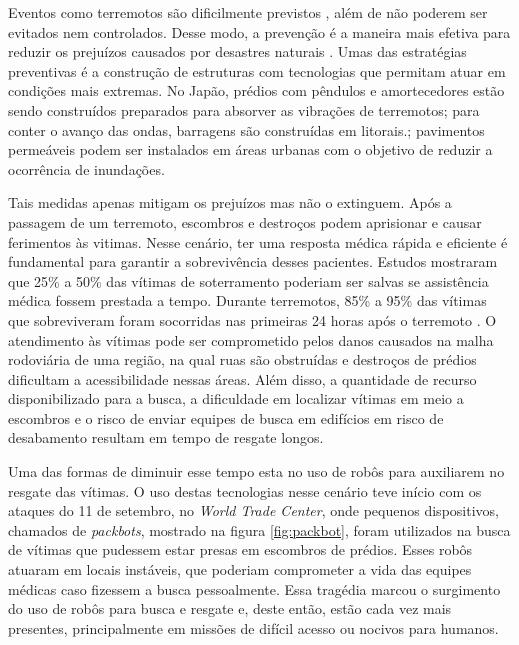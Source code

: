 Eventos como terremotos são dificilmente previstos \cite{kagan1997earthquakes}, além de não poderem ser evitados nem controlados\cite{office1995reducing}.
Desse modo, a prevenção é a maneira mais efetiva para reduzir os prejuízos causados por desastres naturais \cite{durkin1992improving}. Umas das estratégias preventivas é a construção de estruturas com tecnologias que permitam atuar em condições mais extremas. No Japão, prédios com pêndulos\cite{nagase2000earthquake} e amortecedores \cite{takewaki2011smart} estão sendo construídos preparados para absorver as vibrações de terremotos; para conter o avanço das ondas, barragens são construídas em litorais.\cite{kamphuis2010introduction}; pavimentos permeáveis podem ser instalados em áreas urbanas com o objetivo de reduzir a ocorrência de inundações.\cite{selbig2018evaluating}

Tais medidas apenas mitigam os prejuízos mas não o extinguem.
Após a passagem de um terremoto, escombros e destroços podem aprisionar e causar ferimentos às vitimas. Nesse cenário, ter uma resposta médica rápida e eficiente é fundamental para garantir a sobrevivência desses pacientes. Estudos mostraram que 25\% a 50\% das vítimas de soterramento poderiam ser salvas se assistência médica fossem prestada a tempo. Durante terremotos, 85\% a 95\% das vítimas que sobreviveram foram socorridas nas primeiras 24 horas após o terremoto \cite{schultz1996medical}.
O atendimento às vítimas pode ser comprometido pelos danos causados na malha rodoviária de uma região, na qual ruas são obstruídas e destroços de prédios dificultam a acessibilidade nessas áreas. Além disso, a quantidade de recurso disponibilizado para a busca, a dificuldade em localizar vítimas em meio a escombros e o risco de enviar equipes de busca em edifícios em risco de desabamento resultam em tempo de resgate longos. 

Uma das formas de diminuir esse tempo esta no uso de robôs para auxiliarem no resgate das vítimas. O uso destas tecnologias nesse cenário teve início com os ataques do 11 de setembro, no \textit{World Trade Center}, onde pequenos dispositivos, chamados de \textit{packbots}, mostrado na figura \ref{fig:packbot}, foram utilizados na busca de vítimas que pudessem estar presas em escombros de prédios. Esses robôs atuaram em locais instáveis, que poderiam comprometer a vida das equipes médicas caso fizessem a busca pessoalmente\cite{murphy2004trial}. Essa tragédia marcou o surgimento do uso de robôs para busca e resgate e, deste então, estão cada vez mais presentes, principalmente em missões de difícil acesso ou nocivos para humanos.



